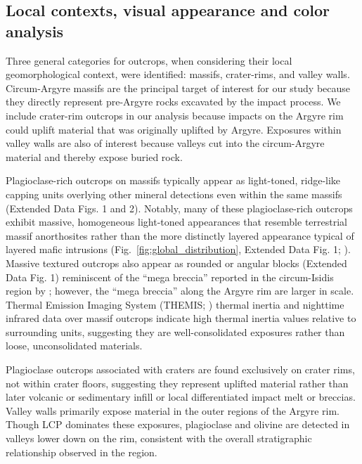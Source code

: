 \documentclass[12pt]{article}
\begin{document}
\subsection*{Local contexts, visual appearance and color analysis}

Three general categories for outcrops, when considering their local geomorphological context, were identified: massifs, crater-rims, and valley walls. Circum-Argyre massifs are the principal target of interest for our study because they directly represent pre-Argyre rocks excavated by the impact process. We include crater-rim outcrops in our analysis because impacts on the Argyre rim could uplift material that was originally uplifted by Argyre. Exposures within valley walls are also of interest because valleys cut into the circum-Argyre material and thereby expose buried rock.

Plagioclase-rich outcrops on massifs typically appear as light-toned, ridge-like capping units overlying other mineral detections even within the same massifs (Extended Data Figs. 1 and 2). Notably, many of these plagioclase-rich outcrops exhibit massive, homogeneous light-toned appearances that resemble terrestrial massif anorthosites rather than the more distinctly layered appearance typical of layered mafic intrusions (Fig.~\ref{fig:global_distribution}, Extended Data Fig. 1; \citealt{Ashwal1993}). Massive textured outcrops also appear as rounded or angular blocks (Extended Data Fig. 1) reminiscent of the ``mega breccia'' reported in the circum-Isidis region by \citet{Scheller2020}; however, the ``mega breccia'' along the Argyre rim are larger in scale. Thermal Emission Imaging System (THEMIS; \citealt{Christensen2004}) thermal inertia \citep{Fergason2006} and nighttime infrared data \citep{Edwards2011} over massif outcrops indicate high thermal inertia values relative to surrounding units, suggesting they are well-consolidated exposures rather than loose, unconsolidated materials.

Plagioclase outcrops associated with craters are found exclusively on crater rims, not within crater floors, suggesting they represent uplifted material rather than later volcanic or sedimentary infill or local differentiated impact melt or breccias. Valley walls primarily expose material in the outer regions of the Argyre rim. Though LCP dominates these exposures, plagioclase and olivine are detected in valleys lower down on the rim, consistent with the overall stratigraphic relationship observed in the region.
\end{document}
